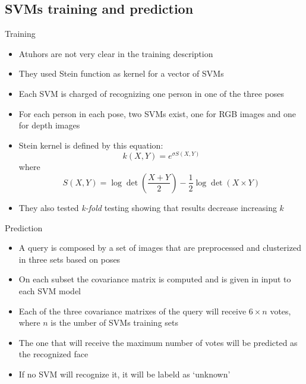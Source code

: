 \documentclass{beamer}
\begin{document}
\subsection{SVMs training and prediction}
\begin{frame}{Training}
	\begin{itemize}
		\item Atuhors are not very clear in the training description
		\item They used Stein function as kernel for a vector of SVMs
		\item Each SVM is charged of recognizing one person in one of
			the three poses
		\item For each person in each pose, two SVMs exist, one for RGB
			images and one for depth images
		\item Stein kernel is defined by this equation:
			$$
			k(X, Y) = e^{\sigma S(X,Y)}
			$$
			where
			$$
			S(X, Y) = \log\det\left(\frac{X +
			Y}{2}\right)-\frac{1}{2} \log \det(X\times Y)
			$$
		\item They also tested \textit{k-fold} testing showing that
			results decrease increasing $k$

	\end{itemize}
\end{frame}

\begin{frame}{Prediction}
	\begin{itemize}
		\item A query is composed by a set of images that are
			preprocessed and clusterized in three sets based on
			poses
		\item On each subset the covariance matrix is computed and is
			given in input to each SVM model
		\item Each of the three covariance matrixes of the query will
			receive $6 \times n$ votes, where $n$ is the umber of
			SVMs training sets
		\item The one that will receive the maximum number of votes
			will be predicted as the recognized face
		\item If no SVM will recognize it, it will be labeld as
			`unknown'
	\end{itemize}
\end{frame}
\end{document}
